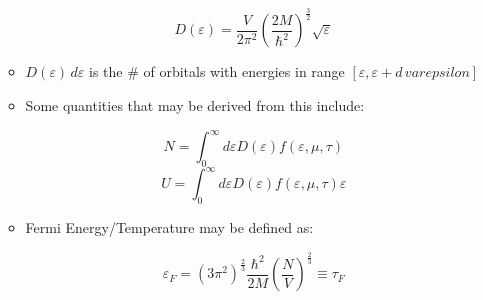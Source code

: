 \begin{itemize}
\begin{itemize}
        $$D(\varepsilon)=\frac{V}{2\pi^2}\left( \frac{2M}{\hbar^2} \right)^{\frac{3}{2}}\sqrt{\varepsilon}$$

      \item $D(\varepsilon)\,d\varepsilon$ is the \# of orbitals with energies in range $[\varepsilon,\varepsilon+d\,varepsilon]$

      \item Some quantities that may be derived from this include:

        $$N=\int_0^\infty d\varepsilon D(\varepsilon)f(\varepsilon,\mu,\tau)$$
        $$U=\int_0^\infty d\varepsilon D(\varepsilon)f(\varepsilon,\mu,\tau)\varepsilon$$

      \item Fermi Energy/Temperature may be defined as:

        $$\varepsilon_F=\left( 3\pi^2 \right)^{\frac{2}{3}}\frac{\hbar^2}{2M}\left( \frac{N}{V} \right)^{\frac{2}{3}}\equiv\tau_F$$

    \end{itemize}

\end{itemize}





